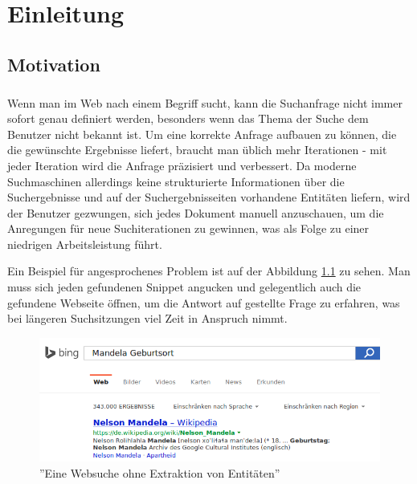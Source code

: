 \chapter{Einleitung}

\section{Motivation}
\label{sec:Motivation}
\paragraph{}
Wenn man im Web nach einem Begriff sucht, kann die Suchanfrage nicht immer sofort genau definiert werden, besonders wenn das Thema der Suche dem Benutzer nicht bekannt ist. Um eine korrekte Anfrage aufbauen zu können, die die gewünschte Ergebnisse liefert, braucht man üblich mehr Iterationen - mit jeder Iteration wird die Anfrage präzisiert und verbessert. Da moderne Suchmaschinen allerdings keine strukturierte Informationen über die Suchergebnisse und auf der Suchergebnisseiten vorhandene Entitäten liefern, wird der Benutzer gezwungen, sich jedes Dokument manuell anzuschauen, um die Anregungen für neue Suchiterationen zu gewinnen, was als Folge zu einer niedrigen Arbeitsleistung führt.

Ein Beispiel für angesprochenes Problem ist auf der Abbildung \ref{fig:bing-issue} zu sehen. Man muss sich jeden gefundenen Snippet angucken und gelegentlich auch die gefundene Webseite öffnen, um die Antwort auf gestellte Frage zu erfahren, was bei längeren Suchsitzungen viel Zeit in Anspruch nimmt.

\begin{figure}
\centering
\includegraphics[width=1\textwidth]{Bilder/bing-search1.png}
\caption{''Eine Websuche ohne Extraktion von Entitäten''}
\label{fig:bing-issue}
\end{figure}

